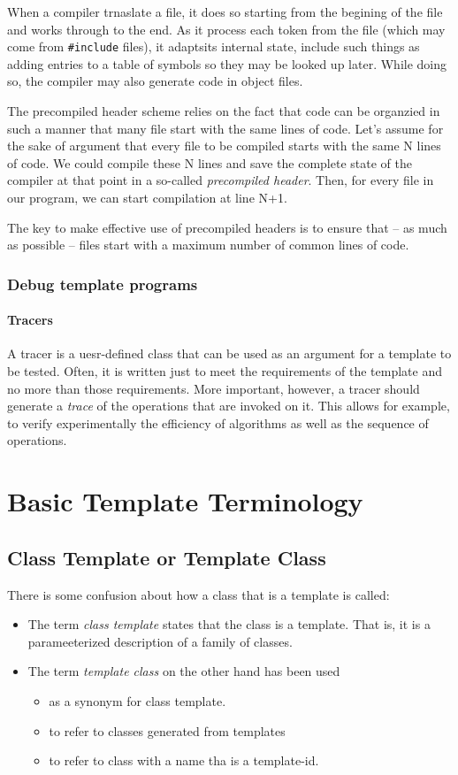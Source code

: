 \documentclass[11pt, a4paper]{book}
\begin{document}
When a compiler trnaslate a file, it does so starting from the begining of the file and works through to the end. As it process each token from the file (which may come from \verb|#include| files), it adaptsits internal state, include such things as adding entries to a table of symbols so they may be looked up later. While doing so, the compiler may also generate code in object files.

The precompiled header scheme relies on the fact that code can be organzied in such a manner that many file start with the same lines of code. Let's assume for the sake of argument that every file to be compiled starts with the same N lines of code. We could compile these N lines and save the complete state of the compiler at that point in a so-called \emph{precompiled header}. Then, for every file in our program, we can start compilation at line N+1. 

The key to make effective use of precompiled headers is to ensure that -- as much as possible -- files start with a maximum number of common lines of code.

\subsubsection{Debug template programs}
\paragraph{Tracers}

A tracer is a uesr-defined class that can be used as an argument for a template to be tested. Often, it is written just to meet the requirements of the template and no more than those requirements. More important, however, a tracer should generate a \emph{trace} of the operations that are invoked on it. This allows for example, to verify experimentally the efficiency of algorithms as well as the sequence of operations.
\section{Basic Template Terminology}
\subsection{Class Template or Template Class}
There is some confusion about how a class that is a template is called:
\begin{itemize}
\item The term \emph{class template} states that the class is a template. That is, it is a parameeterized description of a family of classes.
\item The term \emph{template class} on the other hand has been used
	\begin{itemize}
	\item as a synonym for class template.
	\item to refer to classes generated from templates
	\item to refer to class with a name tha is a template-id.
	\end{itemize}
\end{itemize}
\end{document}
